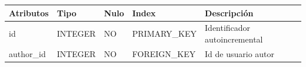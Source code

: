\documentclass[12pt,a4paperpaper,]{report}
\begin{document}
\begin{longtable}[]{@{}lllll@{}}
\toprule
\begin{minipage}[b]{0.21\columnwidth}\raggedright\strut
Atributos\strut
\end{minipage} & \begin{minipage}[b]{0.19\columnwidth}\raggedright\strut
Tipo\strut
\end{minipage} & \begin{minipage}[b]{0.16\columnwidth}\raggedright\strut
Nulo\strut
\end{minipage} & \begin{minipage}[b]{0.19\columnwidth}\raggedright\strut
Index\strut
\end{minipage} & \begin{minipage}[b]{0.11\columnwidth}\raggedright\strut
Descripción\strut
\end{minipage}\tabularnewline
\midrule
\endhead
\begin{minipage}[t]{0.21\columnwidth}\raggedright\strut
id\strut
\end{minipage} & \begin{minipage}[t]{0.19\columnwidth}\raggedright\strut
INTEGER\strut
\end{minipage} & \begin{minipage}[t]{0.16\columnwidth}\raggedright\strut
NO\strut
\end{minipage} & \begin{minipage}[t]{0.19\columnwidth}\raggedright\strut
PRIMARY\_KEY\strut
\end{minipage} & \begin{minipage}[t]{0.11\columnwidth}\raggedright\strut
Identificador autoincremental\strut
\end{minipage}\tabularnewline
\begin{minipage}[t]{0.21\columnwidth}\raggedright\strut
author\_id\strut
\end{minipage} & \begin{minipage}[t]{0.19\columnwidth}\raggedright\strut
INTEGER\strut
\end{minipage} & \begin{minipage}[t]{0.16\columnwidth}\raggedright\strut
NO\strut
\end{minipage} & \begin{minipage}[t]{0.19\columnwidth}\raggedright\strut
FOREIGN\_KEY\strut
\end{minipage} & \begin{minipage}[t]{0.11\columnwidth}\raggedright\strut
Id de usuario autor\strut

\end{minipage}
\end{longtable}
\end{document}
